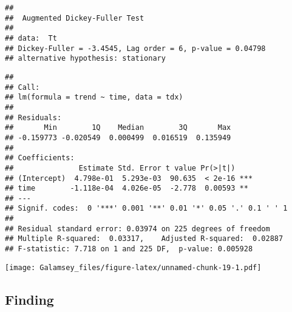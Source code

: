 \documentclass[
]{report}
\newenvironment{Shaded}{\begin{snugshade}}{\end{snugshade}}
\newcommand{\AttributeTok}[1]{\textcolor[rgb]{0.77,0.63,0.00}{#1}}
\newcommand{\DecValTok}[1]{\textcolor[rgb]{0.00,0.00,0.81}{#1}}
\newcommand{\FunctionTok}[1]{\textcolor[rgb]{0.00,0.00,0.00}{#1}}
\newcommand{\NormalTok}[1]{#1}
\newcommand{\OtherTok}[1]{\textcolor[rgb]{0.56,0.35,0.01}{#1}}
\newcommand{\SpecialCharTok}[1]{\textcolor[rgb]{0.00,0.00,0.00}{#1}}
\newcommand{\StringTok}[1]{\textcolor[rgb]{0.31,0.60,0.02}{#1}}
\begin{document}
\begin{verbatim}
## 
##  Augmented Dickey-Fuller Test
## 
## data:  Tt
## Dickey-Fuller = -3.4545, Lag order = 6, p-value = 0.04798
## alternative hypothesis: stationary
\end{verbatim}

\begin{Shaded}
\end{Shaded}

\begin{verbatim}
## 
## Call:
## lm(formula = trend ~ time, data = tdx)
## 
## Residuals:
##       Min        1Q    Median        3Q       Max 
## -0.159773 -0.020549  0.000499  0.016519  0.135949 
## 
## Coefficients:
##               Estimate Std. Error t value Pr(>|t|)    
## (Intercept)  4.798e-01  5.293e-03  90.635  < 2e-16 ***
## time        -1.118e-04  4.026e-05  -2.778  0.00593 ** 
## ---
## Signif. codes:  0 '***' 0.001 '**' 0.01 '*' 0.05 '.' 0.1 ' ' 1
## 
## Residual standard error: 0.03974 on 225 degrees of freedom
## Multiple R-squared:  0.03317,    Adjusted R-squared:  0.02887 
## F-statistic: 7.718 on 1 and 225 DF,  p-value: 0.005928
\end{verbatim}

\begin{Shaded}
\end{Shaded}

\texttt{[image: Galamsey\_files/figure-latex/unnamed-chunk-19-1.pdf]}

\hypertarget{finding}{%
\subsection{Finding}\label{finding}}
\end{document}
